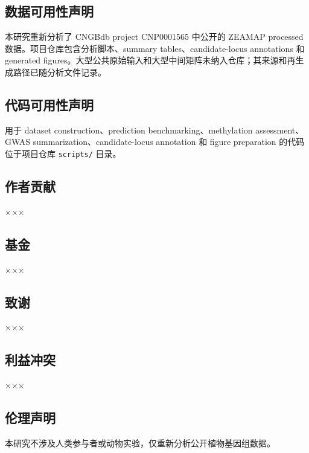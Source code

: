 \documentclass[
]{article}
\begin{document}
\subsection{数据可用性声明}\label{ux6570ux636eux53efux7528ux6027ux58f0ux660e}

本研究重新分析了 CNGBdb project CNP0001565 中公开的 ZEAMAP processed
数据。项目仓库包含分析脚本、summary tables、candidate-locus annotations
和 generated
figures。大型公共原始输入和大型中间矩阵未纳入仓库；其来源和再生成路径已随分析文件记录。

\subsection{代码可用性声明}\label{ux4ee3ux7801ux53efux7528ux6027ux58f0ux660e}

用于 dataset construction、prediction benchmarking、methylation
assessment、GWAS summarization、candidate-locus annotation 和 figure
preparation 的代码位于项目仓库 \texttt{scripts/} 目录。

\subsection{作者贡献}\label{ux4f5cux8005ux8d21ux732e}

×××

\subsection{基金}\label{ux57faux91d1}

×××

\subsection{致谢}\label{ux81f4ux8c22}

×××

\subsection{利益冲突}\label{ux5229ux76caux51b2ux7a81}

×××

\subsection{伦理声明}\label{ux4f26ux7406ux58f0ux660e}

本研究不涉及人类参与者或动物实验，仅重新分析公开植物基因组数据。
\end{document}
